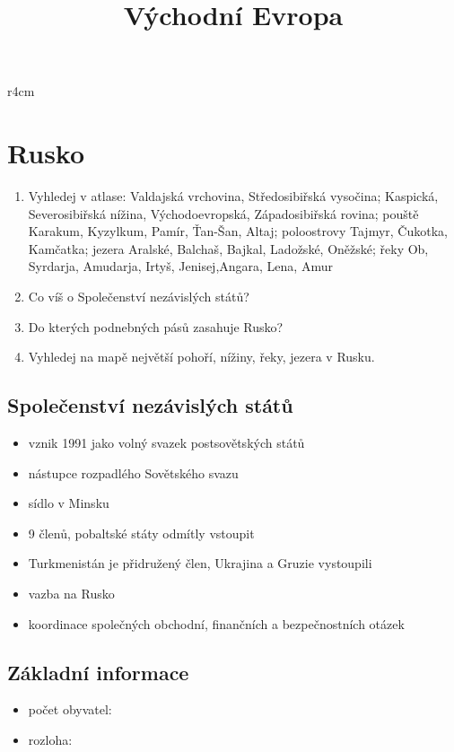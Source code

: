\title{Východní Evropa}


\newpage
\mbox{}
\vspace{-1.5cm}
\begin{wrapfigure}{r}{4cm}
\vspace{-20pt}
\end{wrapfigure}	
\section{Rusko}
\begin{enumerate}
\item Vyhledej v atlase: Valdajská vrchovina, Středosibiřská vysočina; Kaspická, Severosibiřská nížina, Východoevropská, Západosibiřská rovina; pouště Karakum, Kyzylkum, Pamír, Ťan-Šan, Altaj; poloostrovy Tajmyr, Čukotka, Kamčatka; jezera Aralské, Balchaš, Bajkal, Ladožské, Oněžské; řeky Ob, Syrdarja, Amudarja, Irtyš, Jenisej,Angara, Lena, Amur
\item Co víš o Společenství nezávislých států?
\item Do kterých podnebných pásů zasahuje Rusko?
\item Vyhledej na mapě největší pohoří, nížiny, řeky, jezera v Rusku.
\end{enumerate}

\subsection{Společenství nezávislých států}
\begin{itemize}
\item vznik 1991 jako volný svazek postsovětských států
\item nástupce rozpadlého Sovětského svazu
\item sídlo v Minsku
\item 9 členů, pobaltské státy odmítly vstoupit
\item Turkmenistán je přidružený člen, Ukrajina a Gruzie vystoupili
\item vazba na Rusko
\item koordinace společných obchodní, finančních a bezpečnostních otázek
\end{itemize}

\subsection{Základní informace}
\begin{itemize}
\item počet obyvatel:
\item rozloha: 
\end{itemize}

